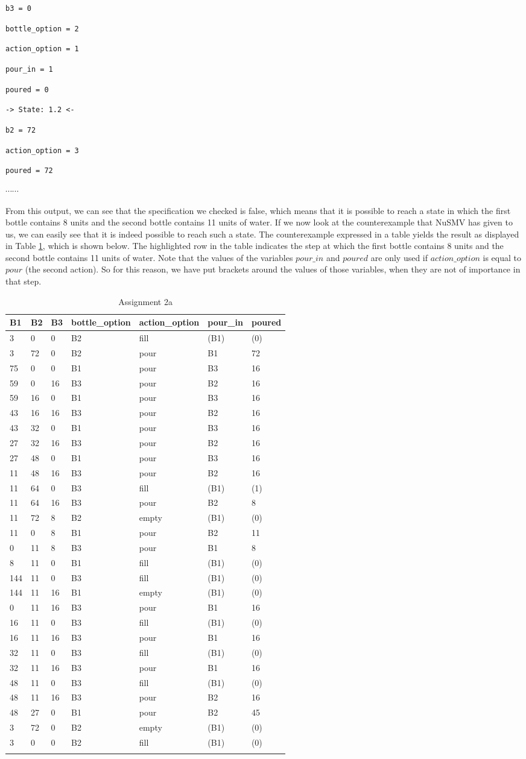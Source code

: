 \documentclass[a4paper]{article}
\begin{document}
{{\tt     b3 = 0 }

{\tt     bottle\_option = 2 }

{\tt     action\_option = 1 }

{\tt     pour\_in = 1 }

{\tt     poured = 0 }

{\tt   -> State: 1.2 <- }

{\tt     b2 = 72 }

{\tt     action\_option = 3 }

{\tt     poured = 72 }

$\cdots \cdots$

From this output, we can see that the specification we checked is false, which means that it is possible to reach a state in which the first bottle contains 8 units and the second bottle contains 11 units of water. If we now look at the counterexample that NuSMV has given to us, we can easily see that it is indeed possible to reach such a state. The counterexample expressed in a table yields the result as displayed in Table \ref{tab:2a}, which is shown below. The highlighted row in the table indicates the step at which the first bottle contains 8 units and the second bottle contains 11 units of water. Note that the values of the variables $pour\_in$ and $poured$ are only used if $action\_option$ is equal to $pour$ (the second action). So for this reason, we have put brackets around the values of those variables, when they are not of importance in that step.

	\begin{longtable}[c]{@{}lllllll@{}}
		\toprule
		B1 & B2 & B3 & bottle\_option & action\_option & pour\_in &
		poured\tabularnewline
		\midrule
		\endhead
		3 & 0 & 0 & B2 & fill & (B1) & (0)\tabularnewline
		3 & 72 & 0 & B2 & pour & B1 & 72\tabularnewline
		75 & 0 & 0 & B1 & pour & B3 & 16\tabularnewline
		59 & 0 & 16 & B3 & pour & B2 & 16\tabularnewline
		59 & 16 & 0 & B1 & pour & B3 & 16\tabularnewline
		43 & 16 & 16 & B3 & pour & B2 & 16\tabularnewline
		43 & 32 & 0 & B1 & pour & B3 & 16\tabularnewline
		27 & 32 & 16 & B3 & pour & B2 & 16\tabularnewline
		27 & 48 & 0 & B1 & pour & B3 & 16\tabularnewline
		11 & 48 & 16 & B3 & pour & B2 & 16\tabularnewline
		11 & 64 & 0 & B3 & fill & (B1) & (1)\tabularnewline
		11 & 64 & 16 & B3 & pour & B2 & 8\tabularnewline
		11 & 72 & 8 & B2 & empty & (B1) & (0)\tabularnewline
		11 & 0 & 8 & B1 & pour & B2 & 11\tabularnewline
		0 & 11 & 8 & B3 & pour & B1 & 8\tabularnewline
		\rowcolor{Highlight}
		8 & 11 & 0 & B1 & fill & (B1) & (0)\tabularnewline
		144 & 11 & 0 & B3 & fill & (B1) & (0)\tabularnewline
		144 & 11 & 16 & B1 & empty & (B1) & (0)\tabularnewline
		0 & 11 & 16 & B3 & pour & B1 & 16\tabularnewline
		16 & 11 & 0 & B3 & fill & (B1) & (0)\tabularnewline
		16 & 11 & 16 & B3 & pour & B1 & 16\tabularnewline
		32 & 11 & 0 & B3 & fill & (B1) & (0)\tabularnewline
		32 & 11 & 16 & B3 & pour & B1 & 16\tabularnewline
		48 & 11 & 0 & B3 & fill & (B1) & (0)\tabularnewline
		48 & 11 & 16 & B3 & pour & B2 & 16\tabularnewline
		48 & 27 & 0 & B1 & pour & B2 & 45\tabularnewline
		3 & 72 & 0 & B2 & empty & (B1) & (0)\tabularnewline
		3 & 0 & 0 & B2 & fill & (B1) & (0)\tabularnewline
		\bottomrule
		\caption{Assignment 2a}
		\label{tab:2a}
	\end{longtable}
	
}
\end{document}
